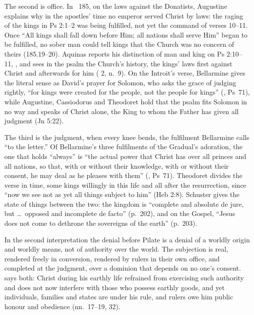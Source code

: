 The second is office. In ~185, on the laws against the
Donatists, Augustine explains why in the apostles' time no emperor served
Christ by laws: the raging of the kings in Ps 2:1--2 was being fulfilled, not
yet the command of verses 10--11. Once ``All kings shall
fall down before Him; all nations shall serve Him'' began to be fulfilled, no
sober man could tell kings that the Church was no concern of theirs
(185.19--20). Aquinas reports his distinction of man and king on Ps
2:10--11, , and
sees in the psalm the Church's history, the kings' laws first against Christ
and afterwards for him ( 2, n.~9). On the Introit's
verse, Bellarmine gives the literal sense as
David's prayer for Solomon, who asks the grace of judging rightly, ``for kings
were created for the people, not the people for kings'' (,
Ps~71), while Augustine, Cassiodorus and Theodoret hold that the psalm fits
Solomon in no way and speaks of Christ alone, the King to whom the Father has
given all judgment (Jn 5:22).

The third is the judgment, when every knee bends, the fulfilment Bellarmine
calls ``to the letter.'' Of Bellarmine's three
fulfilments of the Gradual's adoration, the one that holds
``always'' is ``the actual power that Christ has over all princes and all
nations, so that, with or without their knowledge, with or without their
consent, he may deal as he pleases with them'' (, Ps~71).
Theodoret divides the verse in time, some kings willingly in this life
and all after the resurrection, since ``now we see not as yet all things
subject to him'' (Heb 2:8). Schuster gives the state of things between the
two: the kingdom is ``complete and absolute de jure, but \dots\ opposed and
incomplete de facto'' (p.~202), and on the Gospel, ``Jesus does not come to
dethrone the sovereigns of the earth'' (p.~203).

In the second interpretation the denial before Pilate is a denial of a worldly
origin and worldly means, not of authority over the world. The subjection is real,
rendered freely in conversion, rendered by rulers in their own office, and
completed at the judgment, over a dominion that depends on no one's consent.
 says both: Christ during his
earthly life refrained from exercising such authority and does not now
interfere with those who possess earthly goods, and yet individuals, families
and states are under his rule, and rulers owe him public honour and obedience
(nn.~17--19, 32).

